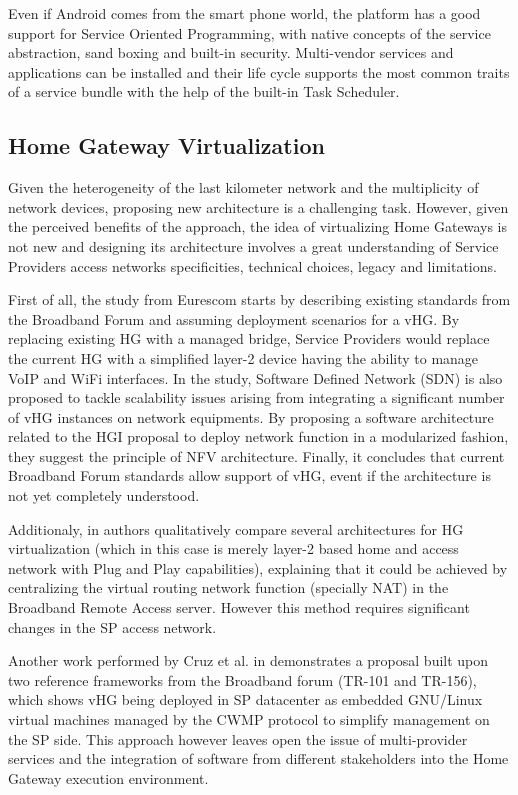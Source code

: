 Even if Android comes from the smart phone world, the platform has a good support for Service Oriented Programming, with native concepts of the service abstraction, sand boxing and built-in security. Multi-vendor services and applications can be installed and their life cycle supports the most common traits of a service bundle with the help of the built-in Task Scheduler.

\subsection{Home Gateway Virtualization}
Given the heterogeneity of the last kilometer network and the multiplicity of network devices, proposing new architecture is a challenging task.
However, given the perceived benefits of the approach, the idea of virtualizing Home Gateways is not new and designing  its architecture involves a great understanding of Service Providers access networks specificities, technical choices, legacy and limitations.

First of all, the study from Eurescom \cite{daniel_abgrall_virtual_????} starts by describing existing standards from the Broadband Forum and assuming deployment scenarios for a vHG.
By replacing existing HG with a managed bridge, Service Providers would replace the current HG with a simplified layer-2 device having the ability to manage VoIP and WiFi interfaces.
In the study, Software Defined Network (SDN) \cite{kim_improving_2013} is also proposed to tackle scalability issues arising from integrating a significant number of vHG instances on network equipments.
By proposing a software architecture related to the HGI proposal to deploy network function in a modularized fashion, they suggest the principle of NFV architecture.
Finally,  it concludes that current Broadband Forum standards allow support of vHG, event if the architecture is not yet completely understood.

Additionaly, in \cite{da_silva_home_2011} authors qualitatively compare several architectures for HG virtualization (which in this case is merely layer-2 based home and access network with Plug and Play capabilities), explaining that it could be achieved by centralizing the virtual routing network function (specially NAT) in the Broadband Remote Access server. However this method requires significant changes in the SP access network.

Another work performed by Cruz et al. in \cite{cruz_architecture_2013} demonstrates a proposal built upon two reference frameworks from the Broadband forum (TR-101 and TR-156), which shows vHG being deployed in SP datacenter as embedded GNU/Linux virtual machines managed by the CWMP protocol to simplify management on the SP side. This approach however leaves open the issue of multi-provider services and the integration of software from different stakeholders into the Home Gateway execution environment.

